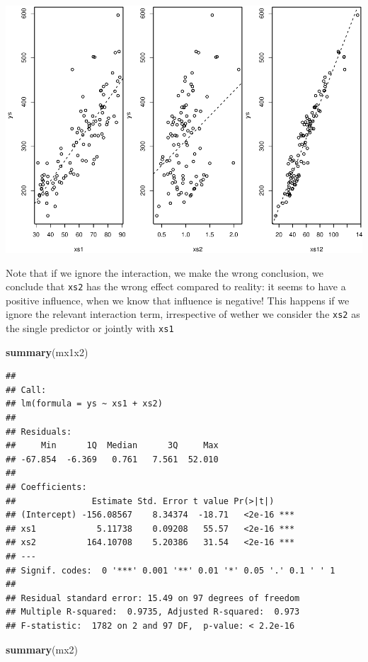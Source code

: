 \documentclass[
]{book}
\newenvironment{Shaded}{\begin{snugshade}}{\end{snugshade}}
\newcommand{\FunctionTok}[1]{\textcolor[rgb]{0.13,0.29,0.53}{\textbf{#1}}}
\newcommand{\NormalTok}[1]{#1}
\begin{document}
\includegraphics{ECOMODbook_files/figure-latex/a12.5-1.pdf}

Note that if we ignore the interaction, we make the wrong conclusion, we conclude that \texttt{xs2} has the wrong effect compared to reality: it seems to have a positive influence, when we know that influence is negative! This happens if we ignore the relevant interaction term, irrespective of wether we consider the \texttt{xs2} as the single predictor or jointly with \texttt{xs1}

\begin{Shaded}
\begin{Highlighting}[]
\FunctionTok{summary}\NormalTok{(mx1x2)}
\end{Highlighting}
\end{Shaded}

\begin{verbatim}
## 
## Call:
## lm(formula = ys ~ xs1 + xs2)
## 
## Residuals:
##     Min      1Q  Median      3Q     Max 
## -67.854  -6.369   0.761   7.561  52.010 
## 
## Coefficients:
##               Estimate Std. Error t value Pr(>|t|)    
## (Intercept) -156.08567    8.34374  -18.71   <2e-16 ***
## xs1            5.11738    0.09208   55.57   <2e-16 ***
## xs2          164.10708    5.20386   31.54   <2e-16 ***
## ---
## Signif. codes:  0 '***' 0.001 '**' 0.01 '*' 0.05 '.' 0.1 ' ' 1
## 
## Residual standard error: 15.49 on 97 degrees of freedom
## Multiple R-squared:  0.9735, Adjusted R-squared:  0.973 
## F-statistic:  1782 on 2 and 97 DF,  p-value: < 2.2e-16
\end{verbatim}

\begin{Shaded}
\begin{Highlighting}[]
\FunctionTok{summary}\NormalTok{(mx2)}
\end{Highlighting}
\end{Shaded}
\end{document}
